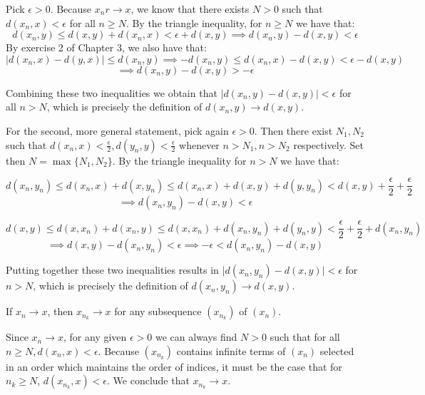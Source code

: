 \begin{solution}
    
    Pick $\epsilon > 0$.
    Because $x_n r\rightarrow x$, we know that there exists $N > 0$ such that $d(x_n, x) < \epsilon$ for all $n \geq N$.
    By the triangle inequality, for $n \geq N$ we have that:
    $$d(x_n, y) \leq d(x, y) + d(x_n, x) < \epsilon + d(x, y) \implies d(x_n, y) - d(x, y) < \epsilon$$
    By exercise 2 of Chapter 3, we also have that:
    $$\lvert d(x_n, x) - d(y, x) \rvert \leq d(x_n, y) \implies -d(x_n, y) \leq d(x_n, x) - d(x, y) < \epsilon - d(x, y) $$
    $$\implies d(x_n, y) - d(x, y) > -\epsilon$$

    Combining these two inequalities we obtain that $\lvert d(x_n, y) - d(x, y) \rvert < \epsilon$ for all $n > N$, which is precisely the definition of $d(x_n, y) \rightarrow d(x, y)$.

    For the second, more general statement, pick again $\epsilon > 0$.
    Then there exist $N_1, N_2$ such that $d(x_n, x) < \frac{\epsilon}{2}, d(y_n, y) < \frac{\epsilon}{2}$ whenever $n > N_1, n > N_2$ respectively.
    Set then $N = \max\{N_1, N_2\}$.
    By the triangle inequality for $n > N$ we have that:

    $$d(x_n, y_n) \leq d(x_n, x) + d(x, y_n) \leq d(x_n, x) + d(x, y) + d(y, y_n) < d(x, y) + \frac{\epsilon}{2} + \frac{\epsilon}{2}$$
    $$\implies d(x_n, y_n) - d(x, y) < \epsilon$$
    
    $$d(x, y) \leq d(x, x_n) + d(x_n, y) \leq d(x, x_n) + d(x_n, y_n) + d(y_n, y) < \frac{\epsilon}{2} + \frac{\epsilon}{2} + d(x_n, y_n)$$
    $$\implies d(x,y) - d(x_n, y_n) < \epsilon \implies - \epsilon < d(x_n, y_n) - d(x, y)$$

    Putting together these two inequalities results in $\lvert d(x_n, y_n) - d(x,y) \rvert < \epsilon$ for $n > N$, which is precisely the definition of $d(x_n, y_n) \rightarrow d(x, y)$.
\end{solution}

\begin{exercise}{35}
    If $x_n \rightarrow x$, then $x_{n_k} \rightarrow x$ for any subsequence $(x_{n_k})$ of $(x_n)$.
\end{exercise}

\begin{solution}
    
    Since $x_n \rightarrow x$, for any given $\epsilon > 0$ we can always find $N > 0 $ such that for all $n \geq N, d(x_n, x) < \epsilon$.
    Because $(x_{n_k})$ contains infinite terms of $(x_n)$ selected in an order which maintains the order of indices, it must be the case that for $n_k \geq N$, $d(x_{n_k}, x) < \epsilon$.
    We conclude that $x_{n_k} \rightarrow x$.

\end{solution}


